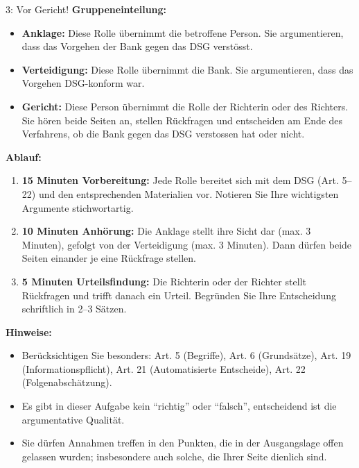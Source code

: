 \begin{lpu}
\begin{aufgabe}{3: Vor Gericht!}
\vspace{1em}
\textbf{Gruppeneinteilung:}

\begin{itemize}
  \item \textbf{Anklage:}  
  Diese Rolle übernimmt die betroffene Person. Sie argumentieren, dass das Vorgehen der Bank gegen das DSG verstösst.

  \item \textbf{Verteidigung:}  
  Diese Rolle übernimmt die Bank. Sie argumentieren, dass das Vorgehen DSG-konform war.

  \item \textbf{Gericht:}  
  Diese Person übernimmt die Rolle der Richterin oder des Richters. Sie hören beide Seiten an, stellen Rückfragen und entscheiden am Ende des Verfahrens, ob die Bank gegen das DSG verstossen hat oder nicht.
\end{itemize}

\vspace{1em}
\textbf{Ablauf:}

\begin{enumerate}
  \item \textbf{15 Minuten Vorbereitung:}  
  Jede Rolle bereitet sich mit dem DSG (Art. 5–22) und den entsprechenden Materialien vor. Notieren Sie Ihre wichtigsten Argumente stichwortartig.

  \item \textbf{10 Minuten Anhörung:}  
  Die Anklage stellt ihre Sicht dar (max. 3 Minuten), gefolgt von der Verteidigung (max. 3 Minuten). Dann dürfen beide Seiten einander je eine Rückfrage stellen.

  \item \textbf{5 Minuten Urteilsfindung:}  
  Die Richterin oder der Richter stellt Rückfragen und trifft danach ein Urteil. Begründen Sie Ihre Entscheidung schriftlich in 2–3 Sätzen.

\end{enumerate}

\vspace{0.5em}
\textbf{Hinweise:}

\begin{itemize}
  \item Berücksichtigen Sie besonders: Art. 5 (Begriffe), Art. 6 (Grundsätze), Art. 19 (Informationspflicht), Art. 21 (Automatisierte Entscheide), Art. 22 (Folgenabschätzung).
  \item Es gibt in dieser Aufgabe kein ``richtig'' oder ``falsch'', entscheidend ist die argumentative Qualität.
  \item Sie dürfen Annahmen treffen in den Punkten, die in der Ausgangslage offen gelassen wurden; insbesondere auch solche, die Ihrer Seite dienlich sind.
\end{itemize}


\end{aufgabe}
\end{lpu}
